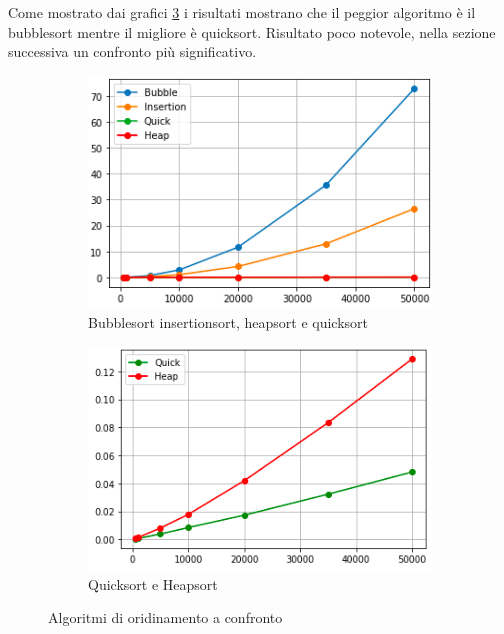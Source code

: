 \documentclass[12pt,a4paper]{report}
\begin{document}
Come mostrato dai grafici \ref{Fig:AllSort} i risultati mostrano che il peggior algoritmo è il bubblesort mentre il migliore è quicksort.  Risultato poco notevole, nella sezione successiva un confronto più significativo.

\begin{figure}[htbp]
     \centering
     \begin{subfigure}[t]{0.45\textwidth}
         \centering
         \includegraphics[width=\textwidth]{Img/GraficiSorting/AllSorting.png}
         \caption{Bubblesort insertionsort, heapsort e quicksort}
         \label{Fig:AllSortingAlg}
     \end{subfigure}
     \hfill
     \begin{subfigure}[t]{0.45\textwidth}
         \centering
         \includegraphics[width=\textwidth]{Img/GraficiSorting/QHSorting.png}
         \caption{Quicksort e Heapsort}
         \label{Fig:QHSort}
     \end{subfigure}

   \caption{Algoritmi di oridinamento a confronto}
   \label{Fig:AllSort}
\end{figure}
\end{document}
